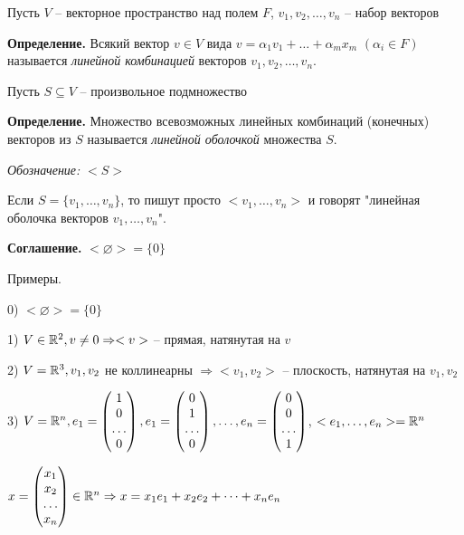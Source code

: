 \bigskip
Пусть $V$ -- векторное пространство над полем $F$, $v_1, v_2, \dots, v_n$ --  набор векторов

\bigskip
\textbf{Определение.} Всякий вектор $v \in V$ вида $v = \alpha_1 v_1 + \dots + \alpha_m x_m$ $(\alpha_i \in F)$ называется \textit{линейной комбинацией} векторов $v_1, v_2, \dots, v_n$.

\bigskip
Пусть $S \subseteq V$ -- произвольное подмножество

\bigskip
\textbf{Определение.} Множество всевозможных линейных комбинаций (конечных) векторов из $S$ называется \textit{линейной оболочкой} множества $S$.

\textit{Обозначение:} $<S>$

\bigskip
Если $S = \{v_1, \dots, v_n\}$, то пишут просто $<v_1, \dots, v_n>$ и говорят "линейная оболочка векторов $v_1, \dots, v_n$".

\bigskip
\textbf{Соглашение.} $<\varnothing> = \{0\}$

\bigskip
Примеры.

0) $<\varnothing> = \{0\}$

1) $V \in \mathbb{R}^2, v \neq 0 \Rightarrow <v>$ -- прямая, натянутая на $v$

2) $V = \mathbb{R}^3, v_1, v_2$ не коллинеарны $\Rightarrow <v_1, v_2>$ -- плоскость, натянутая на $v_1, v_2$

3) $V = \mathbb{R}^n, e_1 = \begin{pmatrix} 1 \\ 0 \\ \dots \\ 0 \end{pmatrix}, e_1 = \begin{pmatrix} 0 \\ 1 \\ \dots \\ 0 \end{pmatrix}, \dots, e_n = \begin{pmatrix} 0 \\ 0 \\ \dots \\ 1 \end{pmatrix}$, $<e_1, \dots, e_n> = \mathbb{R}^n$

$x = \begin{pmatrix} x_1 \\ x_2 \\ \dots \\ x_n \end{pmatrix} \in \mathbb{R}^n \Rightarrow x = x_1 e_1 + x_2 e_2 + \dots + x_n e_n$

